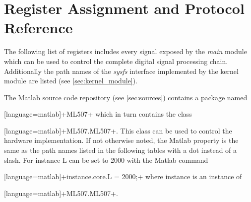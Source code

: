 \documentclass[12pt,a4paper,parskip=full,abstract=true,BCOR=12mm]{scrreprt}
\newcommand{\hack}{}
\newcommand*{\SavedLstInline}{}
\DeclareRobustCommand*{\lstinline}{%
  \ifmmode
    \let\SavedBGroup\bgroup
    \def\bgroup{%
      \let\bgroup\SavedBGroup
      \hbox\bgroup
    }%
  \fi
  \SavedLstInline
}
\def\device#1{\mbox{\textit{#1}}}
\begin{document}
\section{Register Assignment and Protocol Reference}
\label{sec:registers}
\providecommand{\flag}[1]{{\scriptsize\hack #1}}

The following list of registers includes every signal exposed by the \device{main} module which can be used
to control the complete digital signal processing chain. Additionally the path names of
the \device{sysfs} interface implemented by the kernel module are listed (see \cref{sec:kernel_module}).

The Matlab source code repository (see \cref{sec:sources}) contains a package
named \lstinline[language=matlab]+ML507+ which in turn contains the class \lstinline[language=matlab]+ML507.ML507+. This
class can be used to control the hardware implementation. If not otherwise noted,
the Matlab property is the same as the path names listed in the following tables
with a dot instead of a slash. For instance \gls{L} can be set to \num{2000} with the
Matlab command \lstinline[language=matlab]+instance.core.L = 2000;+ where instance
is an instance of \lstinline[language=matlab]+ML507.ML507+.
\end{document}
